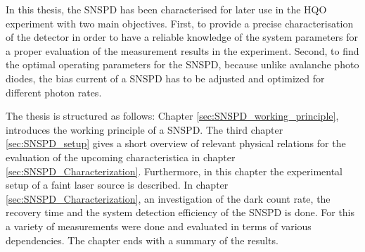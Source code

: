 In this thesis, the SNSPD has been characterised for later use in the HQO experiment with two main objectives.
First, to provide a precise characterisation of the detector in order to have a reliable knowledge of the system
parameters for a proper evaluation of the measurement results in the experiment.
Second, to find the optimal operating parameters for the SNSPD, because unlike avalanche photo diodes, the bias current
of a SNSPD has to be adjusted and optimized for different photon rates.

The thesis is structured as follows:
Chapter \ref{sec:SNSPD_working_principle}, introduces the working principle of a SNSPD.
The third chapter \ref{sec:SNSPD_setup} gives a short overview of relevant physical relations for the evaluation of the upcoming characteristica in chapter \ref{sec:SNSPD_Characterization}.
Furthermore, in this chapter the experimental setup of a faint laser source is described.
In chapter \ref{sec:SNSPD_Characterization}, an investigation of the dark count rate, the recovery time and the system detection efficiency of the SNSPD is done.
For this a variety of measurements were done and evaluated in terms of various dependencies.
The chapter ends with a summary of the results.

